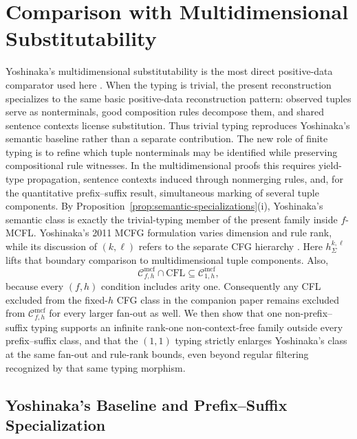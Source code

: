 \documentclass[11pt]{article}
\numberwithin{equation}{section}
\theoremstyle{plain}
\theoremstyle{definition}
\theoremstyle{remark}
\newcommand{\Cmcf}[2]{\mathcal{C}^{\mathrm{mcf}}_{#1,#2}}
\begin{document}
\section{Comparison with Multidimensional Substitutability}
\label{sec:comparison}

Yoshinaka's multidimensional substitutability is the most direct
positive-data comparator used here \cite{Yoshinaka2009,Yoshinaka2011}.  When
the typing is trivial, the present reconstruction specializes to
the same basic positive-data reconstruction pattern: observed tuples serve as nonterminals, good composition rules decompose
them, and shared sentence contexts license substitution.  Thus trivial typing reproduces Yoshinaka's semantic baseline rather than a separate contribution.  The new role of finite typing is to
refine which tuple nonterminals may be identified while preserving compositional rule
witnesses.  In the
multidimensional proofs this requires yield-type propagation, sentence contexts induced through nonmerging rules, and, for the quantitative prefix--suffix result, simultaneous
marking of several tuple components.  By
Proposition~\ref{prop:semantic-specializations}(i), Yoshinaka's semantic class is
exactly the trivial-typing member of the present family inside $f$-MCFL.  Yoshinaka's 2011 MCFG formulation varies dimension and rule rank, while its
discussion of $(k,\ell)$ refers to the separate CFG hierarchy
\cite{Yoshinaka2008}.  Here $h_\Sigma^{k,\ell}$ lifts that boundary comparison
to multidimensional tuple components.  Also,
\[
  \Cmcf{f}{h}\cap\mathrm{CFL}\subseteq\Cmcf{1}{h},
\]
because every $(f,h)$ condition includes arity one.  Consequently any CFL
excluded from the fixed-$h$ CFG class in the companion paper remains excluded
from $\Cmcf{f}{h}$ for every larger fan-out as well.  We then show that one
non-prefix--suffix typing supports an infinite rank-one non-context-free
family outside every prefix--suffix class, and that the $(1,1)$ typing
strictly enlarges Yoshinaka's class at the same fan-out and rule-rank bounds,
even beyond regular filtering recognized by that same typing morphism.

\subsection{Yoshinaka's Baseline and Prefix--Suffix Specialization}
\end{document}

